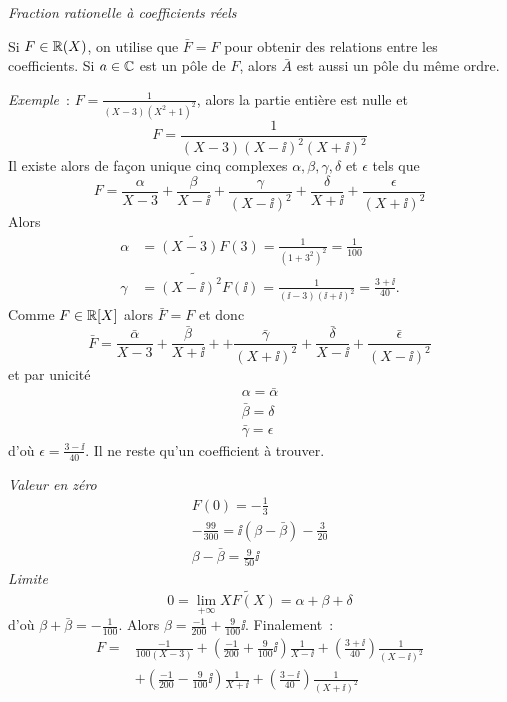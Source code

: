 \emph{Fraction rationelle à coefficients réels}

Si \(F \in \mathbb{R}(X)\), on utilise que \(\bar{F}=F\) pour obtenir des relations entre les coefficients. Si \(a \in \mathbb{C}\) est un pôle de \(F\), alors \(\bar{A}\) est aussi un pôle du même ordre.

\emph{Exemple}~: \(F=\frac{1}{(X-3)(X^2+1)^2}\), alors la partie entière est nulle et
\begin{equation}
  F = \frac{1}{(X-3)(X-\ii)^2(X+\ii)^2}
\end{equation}
Il existe alors de façon unique cinq complexes \(\alpha,\beta,\gamma,\delta\) et \(\epsilon\) tels que
\begin{equation}
  F = \frac{\alpha}{X-3} + \frac{\beta}{X-\ii} +\frac{\gamma}{(X-\ii)^2} +\frac{\delta}{X+\ii} +\frac{\epsilon}{(X+\ii)^2}
\end{equation}
Alors
\begin{align}
  \alpha &= \widetilde{(X-3)F}(3)=\frac{1}{(1+3^2)^2}=\frac{1}{100} \\
  \gamma &= \widetilde{(X-\ii)^2F}(\ii) = \frac{1}{(\ii-3)(\ii+\ii)^2}=\frac{3+\ii}{40}.
\end{align}
Comme \(F \in \mathbb{R}[X]\) alors \(\bar{F}=F\) et donc
\begin{equation}
  \bar{F} = \frac{\bar{\alpha}}{X-3} + \frac{\bar{\beta}}{X+\ii} + +\frac{\bar{\gamma}}{(X+\ii)^2} +\frac{\bar{\delta}}{X-\ii} +\frac{\bar{\epsilon}}{(X-\ii)^2}
\end{equation}
et par unicité
\begin{align}
  \alpha=\bar{\alpha}\\
  \bar{\beta}=\delta\\
  \bar{\gamma}=\epsilon
\end{align}
d'où \(\epsilon = \frac{3-\ii}{40}\). Il ne reste qu'un coefficient à trouver.

\emph{Valeur en zéro}
\begin{align}
  F(0)=-\frac{1}{3}\\
  -\frac{99}{300} = \ii(\beta-\bar{\beta})-\frac{3}{20}\\
  \beta-\bar{\beta}=\frac{9}{50}\ii
\end{align}
\emph{Limite}
\begin{equation}
  0 = \lim\limits_{+\infty}\widetilde{XF(X)}=\alpha+\beta+\delta
\end{equation}
d'où \(\beta+\bar{\beta}=-\frac{1}{100}\). Alors \(\beta = \frac{-1}{200}+\frac{9}{100}\ii\). Finalement~:
\begin{align}
  F = &\frac{-1}{100(X-3)} + \left(\frac{-1}{200}+\frac{9}{100}\ii\right) \frac{1}{X-\ii} + \left(\frac{3+\ii}{40}\right)\frac{1}{(X-\ii)^2} \\ & + \left(\frac{-1}{200}-\frac{9}{100}\ii\right)\frac{1}{X+\ii} + \left(\frac{3-\ii}{40}\right)\frac{1}{(X+\ii)^2}
\end{align}

